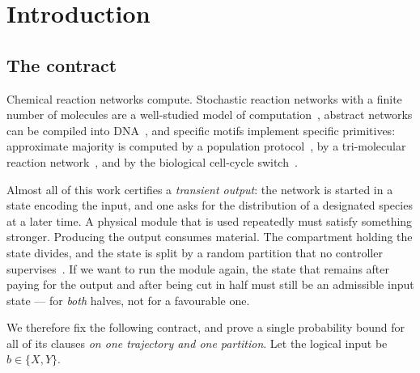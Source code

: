 \documentclass[11pt,a4paper]{article}
\theoremstyle{plain}
\theoremstyle{definition}
\theoremstyle{remark}
\begin{document}
\section{Introduction}\label{sec:intro}

\subsection{The contract}

Chemical reaction networks compute. Stochastic reaction networks with a finite number of
molecules are a well-studied model of computation~\citep{soloveichik2008,chen2014,%
cummings2016}, abstract networks can be compiled into DNA~\citep{soloveichik2010,%
qian2011,chen2013}, and specific motifs implement specific primitives: approximate
majority is computed by a population protocol~\citep{angluin2008}, by a tri-molecular
reaction network~\citep{condon2020}, and by the biological cell-cycle
switch~\citep{cardelli2012}.

Almost all of this work certifies a \emph{transient output}: the network is started in a
state encoding the input, and one asks for the distribution of a designated species at a
later time. A physical module that is used repeatedly must satisfy something stronger.
Producing the output consumes material. The compartment holding the state divides, and
the state is split by a random partition that no controller supervises~\citep{huh2011pnas,%
huh2011ng}. If we want to run the module again, the state that remains after paying for
the output and after being cut in half must still be an admissible input state --- for
\emph{both} halves, not for a favourable one.

We therefore fix the following contract, and prove a single probability bound for all of
its clauses \emph{on one trajectory and one partition}. Let the logical input be
$b\in\{X,Y\}$.
\end{document}

